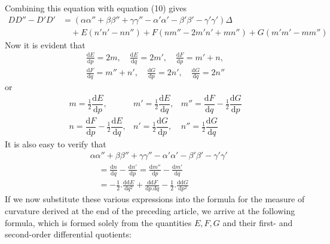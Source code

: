 \par\indent{}%
Combining this equation with equation (10) gives
\begingroup\fontsize{10}{12}\selectfont
\[
\begin{aligned}
DD''-D'D'&=(\alpha\alpha''+\beta\beta''+\gamma\gamma''-\alpha'\alpha'-\beta'\beta'-\gamma'\gamma')\Delta\\
&\quad+E(n'n'-nn'')+F(nm''-2m'n'+mn'')+G(m'm'-mm'')
\end{aligned}
\]
\endgroup
Now it is evident that
\[
\begin{gathered}
\frac{\mathrm{d}E}{\mathrm{d}p}=2m,\quad\frac{\mathrm{d}E}{\mathrm{d}q}=2m',\quad\frac{\mathrm{d}F}{\mathrm{d}p}=m'+n,\\
\frac{\mathrm{d}F}{\mathrm{d}q}=m''+n',\quad\frac{\mathrm{d}G}{\mathrm{d}p}=2n',\quad\frac{\mathrm{d}G}{\mathrm{d}q}=2n''
\end{gathered}
\]
or
\[
\begin{array}{lll}
m=\tfrac{1}{2}\dfrac{\mathrm{d}E}{\mathrm{d}p},&m'=\tfrac{1}{2}\dfrac{\mathrm{d}E}{\mathrm{d}q},&m''=\dfrac{\mathrm{d}F}{\mathrm{d}q}-\tfrac{1}{2}\dfrac{\mathrm{d}G}{\mathrm{d}p}\\[6pt]
n=\dfrac{\mathrm{d}F}{\mathrm{d}p}-\tfrac{1}{2}\dfrac{\mathrm{d}E}{\mathrm{d}q},&n'=\tfrac{1}{2}\dfrac{\mathrm{d}G}{\mathrm{d}p},&n''=\tfrac{1}{2}\dfrac{\mathrm{d}G}{\mathrm{d}q}
\end{array}
\]
It is also easy to verify that
\[
\begin{aligned}
&\alpha\alpha''+\beta\beta''+\gamma\gamma''-\alpha'\alpha'-\beta'\beta'-\gamma'\gamma'\\
&\quad=\frac{\mathrm{d}n}{\mathrm{d}q}-\frac{\mathrm{d}n'}{\mathrm{d}p}=\frac{\mathrm{d}m''}{\mathrm{d}p}-\frac{\mathrm{d}m'}{\mathrm{d}q}\\
&\quad=-\tfrac{1}{2}\mathord{.}\frac{\mathrm{d}\mathrm{d}E}{\mathrm{d}q^2}+\frac{\mathrm{d}\mathrm{d}F}{\mathrm{d}p\mathord{.}\mathrm{d}q}-\tfrac{1}{2}\mathord{.}\frac{\mathrm{d}\mathrm{d}G}{\mathrm{d}p^2}
\end{aligned}
\]
If we now substitute these various expressions into the formula for the measure of curvature derived at the end of the preceding article, we arrive at the following formula, which is formed solely from the quantities \(E,F,G\) and their first- and second-order differential quotients:
